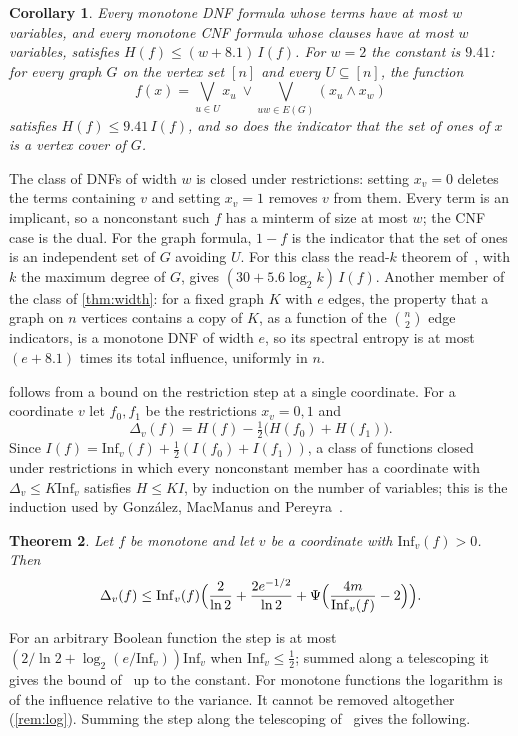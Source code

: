 \documentclass[11pt]{amsart}
\newtheorem{theorem}{Theorem}[section]
\newtheorem{corollary}[theorem]{Corollary}
\theoremstyle{remark}
\newcommand{\Inf}{\mathrm{Inf}}
\begin{document}
\begin{corollary}\label{cor:dnf}
Every monotone DNF formula whose terms have at most $w$ variables, and every monotone CNF formula whose clauses have
at most $w$ variables, satisfies $H(f)\le (w+8.1)\,I(f)$. For $w=2$ the constant is $9.41$: for every graph $G$ on the
vertex set $[n]$ and every $U\subseteq[n]$, the function
\[
f(x)=\bigvee_{u\in U}x_u\ \vee\bigvee_{uw\in E(G)}(x_u\wedge x_w)
\]
satisfies $H(f)\le 9.41\,I(f)$, and so does the indicator that the set of ones of $x$ is a vertex cover of $G$.
\end{corollary}

The class of DNFs of width $w$ is closed under restrictions: setting $x_v=0$ deletes the terms containing $v$ and
setting $x_v=1$ removes $v$ from them. Every term is an implicant, so a nonconstant such $f$ has a minterm of size at
most $w$; the CNF case is the dual. For the graph formula, $1-f$ is the indicator that the set of ones is an
independent set of $G$ avoiding $U$. For this class the read-$k$ theorem of~\cite{Shm26}, with $k$ the maximum
degree of $G$, gives $(30+5.6\log_2k)\,I(f)$. Another member of the
class of \cref{thm:width}: for a fixed graph $K$ with $e$ edges, the property that a graph on $n$ vertices contains a
copy of $K$, as a function of the $\binom n2$ edge indicators, is a monotone DNF of width $e$, so its spectral entropy
is at most $(e+8.1)$ times its total influence, uniformly in $n$.

 follows from a bound on the restriction step at a single coordinate. For a coordinate $v$ let
$f_0,f_1$ be the restrictions $x_v=0,1$ and
\[
\Delta_v(f)=H(f)-\tfrac12\bigl(H(f_0)+H(f_1)\bigr).
\]
Since $I(f)=\Inf_v(f)+\frac12(I(f_0)+I(f_1))$, a class of functions closed under restrictions in which every
nonconstant member has a coordinate with $\Delta_v\le K\Inf_v$ satisfies $H\le KI$, by induction on the number of
variables; this is the induction used by Gonz\'alez, MacManus and Pereyra~\cite{GMP26}.

\begin{theorem}\label{thm:step}
Let $f$ be monotone and let $v$ be a coordinate with $\Inf_v(f)>0$. Then
\[
\Delta_v(f)\le \Inf_v(f)\Bigl(\frac2{\ln 2}+\frac{2e^{-1/2}}{\ln2}+\Psi\Bigl(\frac{4m}{\Inf_v(f)}-2\Bigr)\Bigr).
\]
\end{theorem}

For an arbitrary Boolean function the step is at most $(2/\ln2+\log_2(e/\Inf_v))\Inf_v$ when $\Inf_v\le\frac12$;
summed along a telescoping it gives the bound of~\cite{KMS12} up to the constant. For monotone functions the
logarithm is of the influence relative to the variance. It cannot be removed altogether (\cref{rem:log}). Summing the
step along the telescoping of~\cite{Han25} gives the following.
\end{document}

